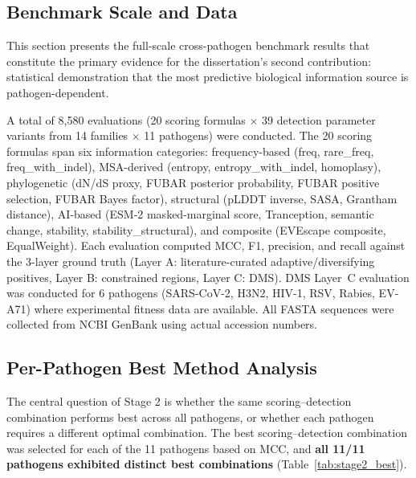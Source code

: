 \subsection{Benchmark Scale and Data}
\label{subsec:9pathogen_scale}

This section presents the full-scale cross-pathogen benchmark results that constitute the primary evidence for the dissertation's second contribution: statistical demonstration that the most predictive biological information source is pathogen-dependent.

A total of 8{,}580 evaluations (20 scoring formulas $\times$ 39 detection parameter variants from 14 families $\times$ 11 pathogens) were conducted.
The 20 scoring formulas span six information categories: frequency-based (freq, rare\_freq, freq\_with\_indel), MSA-derived (entropy, entropy\_with\_indel, homoplasy), phylogenetic (dN/dS proxy, FUBAR posterior probability, FUBAR positive selection, FUBAR Bayes factor), structural (pLDDT inverse, SASA, Grantham distance), AI-based (ESM-2 masked-marginal score, Tranception, semantic change, stability, stability\_structural), and composite (EVEscape composite, EqualWeight).
Each evaluation computed MCC, F1, precision, and recall against the 3-layer ground truth (Layer A: literature-curated adaptive/diversifying positives, Layer B: constrained regions, Layer C: DMS).
DMS Layer~C evaluation was conducted for 6 pathogens (SARS-CoV-2, H3N2, HIV-1, RSV, Rabies, EV-A71) where experimental fitness data are available.
All FASTA sequences were collected from NCBI GenBank using actual accession numbers.

\subsection{Per-Pathogen Best Method Analysis}
\label{subsec:9pathogen_best_combos}

The central question of Stage 2 is whether the same scoring--detection combination performs best across all pathogens, or whether each pathogen requires a different optimal combination.
The best scoring--detection combination was selected for each of the 11 pathogens based on MCC, and \textbf{all 11/11 pathogens exhibited distinct best combinations} (Table~\ref{tab:stage2_best}).


